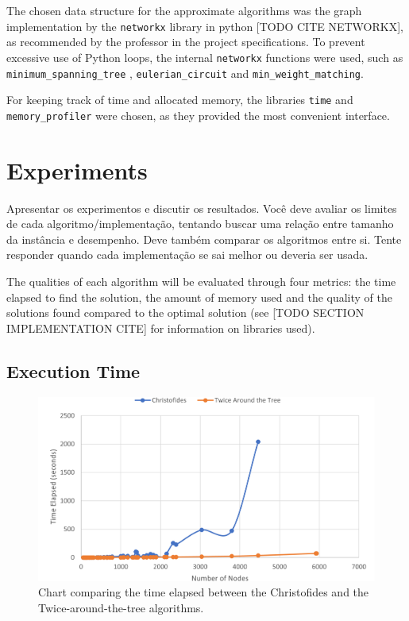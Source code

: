 \documentclass[12pt]{article}
\begin{document}
The chosen data structure for the approximate algorithms was the graph implementation 
by the \texttt{networkx} library in python [TODO CITE NETWORKX], as recommended by 
the professor in the project specifications. To prevent excessive use of Python loops, 
the internal \texttt{networkx} functions were used, such as \texttt{minimum\_spanning\_tree} , 
\texttt{eulerian\_circuit} and \texttt{min\_weight\_matching}.

For keeping track of time and allocated memory, the libraries \texttt{time} and 
\texttt{memory\_profiler} were chosen, as they provided the most convenient interface.

\section{Experiments} \label{sec:firstpage}
    Apresentar os experimentos e discutir os resultados. Você deve avaliar os
    limites de cada algoritmo/implementação, tentando buscar uma relação entre
    tamanho da instância e desempenho. Deve também comparar os algoritmos
    entre si. Tente responder quando cada implementação se sai melhor ou
    deveria ser usada.

The qualities of each algorithm will be evaluated through four metrics: the time elapsed 
to find the solution, the amount of memory used and the quality of the solutions found 
compared to the optimal solution (see [TODO SECTION IMPLEMENTATION CITE] for information 
on libraries used).

\subsection{Execution Time}

\begin{figure}[ht]
\centering
\includegraphics[height=.325\textheight]{execution_time_comparison.png}
\caption{Chart comparing the time elapsed between the Christofides and the Twice-around-the-tree algorithms.}
\label{fig:exec_time}
\end{figure}
\end{document}
